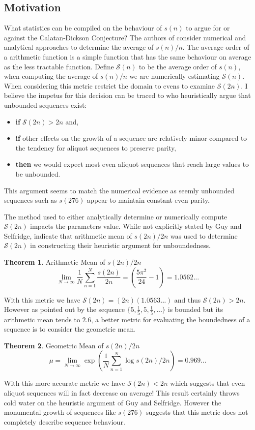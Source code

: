 \documentclass{article}
\theoremstyle{definition}
\newtheorem{theorem}{Theorem}[section]
\begin{document}
\subsection{Motivation}
What statistics can be compiled on the behaviour of $s(n)$ to argue for or against the Calatan-Dickson Conjecture? The authors of \cite{chum_guy_jacobson_mosunov_2018} consider numerical and analytical approaches to determine the average of $s(n) / n$. The average order of a arithmetic function is a simple function that has the same behaviour on average as the less tractable function. Define $\mathcal{S}(n)$ to be the average order of $s(n)$, when computing the average of $s(n) / n$ we are numerically estimating $\mathcal{S}(n)$. When considering this metric \cite{chum_guy_jacobson_mosunov_2018} restrict the domain to evens to examine $\mathcal{S}(2n)$. I believe the impetus for this decision can be traced to \cite{guy_selfridge_1975} who heuristically argue that unbounded sequences exist:
\begin{itemize}
    \item \textbf{if} $\mathcal{S}(2n) > 2n$ and,
    \item \textbf{if} other effects on the growth of a sequence are relatively minor compared to the tendency for aliquot sequences to preserve parity,
    \item \textbf{then} we would expect most even aliquot sequences that reach large values to be unbounded.
\end{itemize}
This argument seems to match the numerical evidence as seemly unbounded sequences such as $s(276)$ \cite{zimmermann_2016} appear to maintain constant even parity.

The method used to either analytically determine or numerically compute $\mathcal{S}(2n)$ impacts the parameters value. While not explicitly stated by Guy and Selfridge, \cite{bosma_kane_2010} indicate that arithmetic mean of $s(2n) / 2n$ was used to determine $\mathcal{S}(2n)$ in constructing their heuristic argument for unboundedness.
%
\begin{theorem} Arithmetic Mean of $s(2n) / 2n$
    $$\lim_{N \to \infty} \frac{1}{N} \sum_{n = 1}^{N} \frac{s(2n)}{2n} = \left(\frac{5\pi^2}{24} - 1\right) = 1.0562...$$
\end{theorem}
%
With this metric we have $\mathcal{S}(2n) = (2n)(1.0563...)$ and thus $\mathcal{S}(2n) > 2n$. However as pointed out by \cite{bosma_kane_2010} the sequence $\{5, \frac{1}{5}, 5, \frac{1}{5}, ... \}$ is bounded but its arithmetic mean tends to $2.6$, a better metric for evaluating the boundedness of a sequence is to consider the geometric mean.
%
\begin{theorem}Geometric Mean of $s(2n) / 2n$
    $$\mu =\lim_{N \to \infty} \exp{\left( \frac{1}{N} \sum_{n=1}^{N} \log s(2n) / 2n \right) =  0.969...}$$
\end{theorem}
%
With this more accurate metric we have $\mathcal{S}(2n) < 2n$ which suggests that even aliquot sequences will in fact decrease on average! This result certainly throws cold water on the heuristic argument of Guy and Selfridge. However the monumental growth of sequences like $s(276)$ suggests that this metric does not completely describe sequence behaviour.
\end{document}
